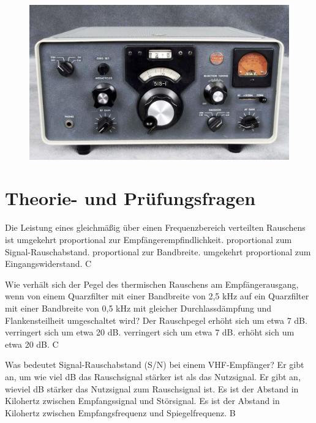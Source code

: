 \begin{figure}
 \vspace{-6cm}
\includegraphics[scale=0.2]{Geraetetechnik/Bilder/Collins_51S-1_front.jpg}
 \vspace{-6cm}
\end{figure}

\section*{Theorie- und Prüfungsfragen} 

{ Die Leistung eines gleichmäßig über einen Frequenzbereich verteilten Rauschens ist}%
{umgekehrt proportional zur Empfängerempfindlichkeit.}%
{proportional zum Signal-Rauschabstand.}%
{proportional zur Bandbreite.}%
{umgekehrt proportional zum Eingangswiderstand.}%
{C}%

{Wie verhält sich der Pegel des thermischen Rauschens am Empfängerausgang, wenn von einem Quarzfilter mit einer Bandbreite von 2,5 kHz auf ein Quarzfilter mit einer Bandbreite von 0,5 kHz mit gleicher Durchlassdämpfung und Flankensteilheit umgeschaltet wird? Der Rauschpegel}%
{erhöht sich um etwa 7 dB.}%
{verringert sich um etwa 20 dB.}%
{verringert sich um etwa 7 dB.}%
{erhöht sich um etwa 20 dB.}%
{C}%

{Was bedeutet Signal-Rauschabstand (S/N) bei einem VHF-Empfänger?}%
{Er gibt an, um wie viel dB das Rauschsignal stärker ist als das Nutzsignal.}%
{Er gibt an, wieviel dB stärker das Nutzsignal zum Rauschsignal ist.}%
{Es ist der Abstand in Kilohertz zwischen Empfangssignal und Störsignal.}%
{Es ist der Abstand in Kilohertz zwischen Empfangsfrequenz und Spiegelfrequenz.}%
{B}%

